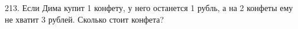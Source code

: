 213. Если Дима купит 1 конфету, у него останется 1 рубль, а на 2 конфеты ему не хватит 3 рублей. Сколько стоит конфета?\\

